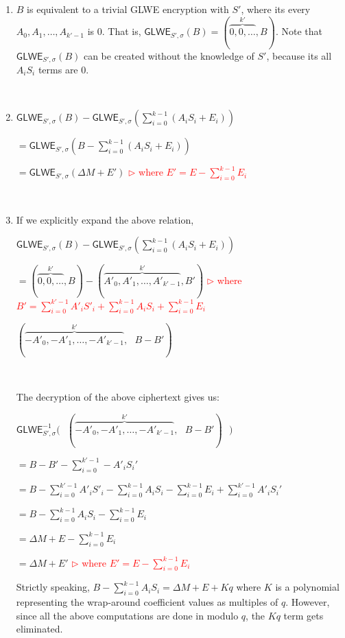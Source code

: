 \begin{myproof}
\begin{enumerate}
 \item $B$ is equivalent to a trivial GLWE encryption with $S'$, where its every $A_0, A_1, \ldots, A_{k'-1}$ is 0. That is, $\textsf{GLWE}_{S', \sigma}(B) = (\overbrace{0, 0, \ldots}^{k'}, B)$. Note that $\textsf{GLWE}_{S', \sigma}(B)$ can be created without the knowledge of $S'$, because its all $A_iS_i$ terms are 0. 

$ $
 
 \item $\textsf{GLWE}_{S', \sigma}(B) - \textsf{GLWE}_{S', \sigma} \left( \sum \limits_{i=0}^{k-1} (A_i  S_i + E_i )\right) $
 
 $= \textsf{GLWE}_{S', \sigma}(B - \sum \limits_{i=0}^{k-1} (A_i  S_i + E_i)) $
 
 $= \textsf{GLWE}_{S', \sigma}(\Delta M + E')$ \textcolor{red}{ $\rhd$ where $E' = E - \sum\limits_{i=0}^{k-1}E_i$}

$ $

\item If we explicitly expand the above relation, 

$\textsf{GLWE}_{S', \sigma}(B) - \textsf{GLWE}_{S', \sigma} \left(\sum \limits_{i=0}^{k-1} (A_i  S_i + E_i)\right)$

$ = (\overbrace{0, 0, \ldots}^{k'}, B) - (\overbrace{A'_0, A'_1, \ldots, A'_{k'-1}}^{k'}, B')  $ \text { } \textcolor{red}{ $\rhd$ where $B' = \sum\limits_{i=0}^{k'-1} A'_iS'_i + \sum\limits_{i=0}^{k-1} A_iS_i + \sum\limits_{i=0}^{k-1}E_i$}

$(\overbrace{-A'_0, -A'_1, \ldots, -A'_{k'-1}}^{k'}, \text{ } B - B')$

$ $

The decryption of the above ciphertext gives us:

$ \textsf{GLWE}_{S', \sigma}^{-1} \bm{\Big(} \text{ } (\overbrace{-A'_0, -A'_1, \ldots, -A'_{k'-1}}^{k'}, \text{ } B - B') \text{ } \bm{\Big)}$

$ = B -  B' - \sum\limits_{i=0}^{k'-1} -A'_iS_i'$

$= B - \sum\limits_{i=0}^{k'-1} A'_iS'_i - \sum\limits_{i=0}^{k-1} A_iS_i - \sum\limits_{i=0}^{k-1}E_i + \sum\limits_{i=0}^{k'-1} A'_iS_i'$

$= B - \sum\limits_{i=0}^{k-1} A_iS_i - \sum\limits_{i=0}^{k-1}E_i$

$= \Delta M + E - \sum\limits_{i=0}^{k-1}E_i $

$= \Delta M + E'$ \textcolor{red}{ $\rhd$ where $E' = E - \sum\limits_{i=0}^{k-1}E_i$}

Strictly speaking, $B - \sum\limits_{i=0}^{k-1} A_iS_i = \Delta M + E + Kq$ where $K$ is a polynomial representing the wrap-around coefficient values as multiples of $q$. However, since all the above computations are done in modulo $q$, the $Kq$ term gets eliminated. 


\end{enumerate}
\end{myproof}
